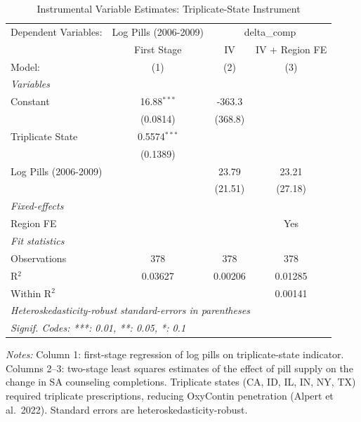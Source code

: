 
\begin{table}[htbp]
   \caption{\label{tab:iv} Instrumental Variable Estimates: Triplicate-State Instrument}
   \centering
   \begin{tabular}{lccc}
      \tabularnewline \midrule \midrule
      Dependent Variables: & Log Pills (2006-2009) & \multicolumn{2}{c}{delta\_comp}\\
                            & First Stage    & IV      & IV + Region FE \\   
      Model:                & (1)            & (2)     & (3)\\  
      \midrule
      \emph{Variables}\\
      Constant              & 16.88$^{***}$  & -363.3  &   \\   
                            & (0.0814)       & (368.8) &   \\   
      Triplicate State      & 0.5574$^{***}$ &         &   \\   
                            & (0.1389)       &         &   \\   
      Log Pills (2006-2009) &                & 23.79   & 23.21\\   
                            &                & (21.51) & (27.18)\\   
      \midrule
      \emph{Fixed-effects}\\
      Region FE             &                &         & Yes\\  
      \midrule
      \emph{Fit statistics}\\
      Observations          & 378            & 378     & 378\\  
      R$^2$                 & 0.03627        & 0.00206 & 0.01285\\  
      Within R$^2$          &                &         & 0.00141\\  
      \midrule \midrule
      \multicolumn{4}{l}{\emph{Heteroskedasticity-robust standard-errors in parentheses}}\\
      \multicolumn{4}{l}{\emph{Signif. Codes: ***: 0.01, **: 0.05, *: 0.1}}\\
   \end{tabular}
   
   \par \raggedright 
   \textit{Notes:} Column 1: first-stage regression of log pills on triplicate-state indicator. Columns 2--3: two-stage least squares estimates of the effect of pill supply on the change in SA counseling completions. Triplicate states (CA, ID, IL, IN, NY, TX) required triplicate prescriptions, reducing OxyContin penetration (Alpert et al.\ 2022). Standard errors are heteroskedasticity-robust.
\end{table}


